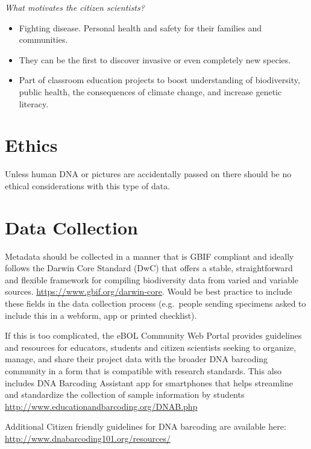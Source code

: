 \documentclass[]{article}
\providecommand{\tightlist}{%
  \setlength{\itemsep}{0pt}\setlength{\parskip}{0pt}}
\begin{document}
\emph{What motivates the citizen scientists?}

\begin{itemize}
\tightlist
\item
  Fighting disease. Personal health and safety for their families and communities.
\item
  They can be the first to discover invasive or even completely new species.
\item
  Part of classroom education projects to boost understanding of biodiversity, public health, the consequences of climate change, and increase genetic literacy.
\end{itemize}

\hypertarget{ethics}{%
\section{Ethics}\label{ethics}}

Unless human DNA or pictures are accidentally passed on there should be no ethical considerations with this type of data.

\hypertarget{data-collection}{%
\section{Data Collection}\label{data-collection}}

Metadata should be collected in a manner that is GBIF compliant and ideally follows the Darwin Core Standard (DwC) that offers a stable, straightforward and flexible framework for compiling biodiversity data from varied and variable sources. \url{https://www.gbif.org/darwin-core}. Would be best practice to include these fields in the data collection process (e.g.~people sending specimens asked to include this in a webform, app or printed checklist).

If this is too complicated, the eBOL Community Web Portal provides guidelines and resources for educators, students and citizen scientists seeking to organize, manage, and share their project data with the broader DNA barcoding community in a form that is compatible with research standards. This also includes DNA Barcoding Assistant app for smartphones that helps streamline and standardize the collection of sample information by students \url{http://www.educationandbarcoding.org/DNAB.php}

Additional Citizen friendly guidelines for DNA barcoding are available here: \url{http://www.dnabarcoding101.org/resources/}
\end{document}
